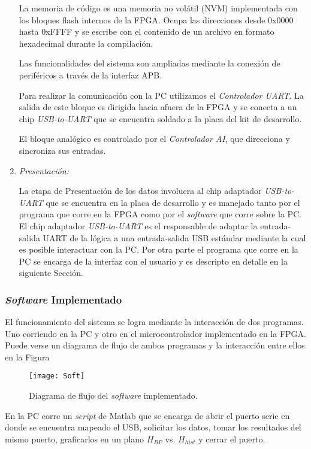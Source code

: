 \begin{enumerate}
	La memoria de código es una memoria no volátil (NVM) implementada con los bloques flash internos de la FPGA.
	Ocupa las direcciones desde 0x0000 hasta 0xFFFF y se escribe con el contenido de un archivo en formato hexadecimal durante la compilación.
	
	Las funcionalidades del sistema son ampliadas mediante la conexión de periféricos a través de la interfaz APB.
	
	Para realizar la comunicación con la PC utilizamos el \textit{Controlador UART}.
	La salida de este bloque es dirigida hacia afuera de la FPGA y se conecta a un chip \textit{USB-to-UART} que se encuentra soldado a la placa del kit de desarrollo.
	
	El bloque analógico es controlado por el \textit{Controlador AI}, que direcciona y sincroniza sus entradas.
	
	\item \textit{Presentación:}
	
	La etapa de Presentación de los datos involucra al chip adaptador \textit{USB-to-UART} que se encuentra en la placa de desarrollo y es manejado tanto por el programa que corre en la FPGA como por el \textit{software} que corre sobre la PC.
	El chip adaptador \textit{USB-to-UART} es el responsable de adaptar la entrada-salida UART de la lógica a una entrada-salida USB estándar mediante la cual es posible interactuar con la PC.
	Por otra parte el programa que corre en la PC se encarga de la interfaz con el usuario y es descripto en detalle en la siguiente Sección.
	
\end{enumerate}

\subsubsection{\textit{Software} Implementado}
\label{sec:Software}

El funcionamiento del sistema se logra mediante la interacción de dos programas.
Uno corriendo en la PC y otro en el microcontrolador implementado en la FPGA.
Puede verse un diagrama de flujo de ambos programas y la interacción entre ellos en la Figura
\begin{figure}[htpb]
	\centering\texttt{[image: Soft]}
	\caption{Diagrama de flujo del \textit{software} implementado.}\label{fig.softflow}
\end{figure}

En la PC corre un \textit{script} de Matlab que se encarga de abrir el puerto serie en donde se encuentra mapeado el USB, solicitar los datos, tomar los resultados del mismo puerto, graficarlos en un plano $H_{BP}$ vs. $H_{hist}$ y cerrar el puerto.

